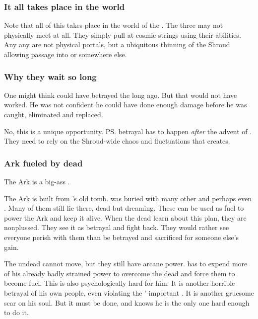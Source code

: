 \subsubsection{It all takes place in the \matrix{} world}
Note that all of this takes place in the world of the \matrices. 
The three may not physically meet at all. 
They simply pull at cosmic strings using their \vertex{} abilities. 
Any any  are not physical portals, but a ubiquitous thinning of the Shroud allowing passage into \Erebos{} or somewhere else. 





\subsubsection{Why they wait so long}
One might think \Azraid{} could have betrayed the \banes{} long ago. 
But that would not have worked. 
He was not confident he could have done enough damage before he was caught, eliminated and replaced. 

No, this is a unique opportunity. 
\ps{\Azraid} betrayal has to happen \emph{after} the advent of \Lithrim. 
They need to rely on the Shroud-wide chaos and fluctuations that \Lithrim{} creates.





\subsubsection{Ark fueled by dead \ophidians}
The Ark is a big-ass . 

The Ark is built from \Sethicus's old tomb. 
\Sethicus was buried with many other \ophidians and perhaps even \dragons.
Many of them still lie there, dead but dreaming. 
These can be used as fuel to power the Ark and keep it alive. 
When the dead learn about this plan, they are nonplussed. 
They see it as betrayal and fight back. 
They would rather see everyone perish with them than be betrayed and sacrificed for someone else's gain. 

The undead cannot move, but they still have arcane power. 
\Ishnaruchaefir has to expend more of his already badly strained power to overcome the dead and force them to become fuel. 
This is also psychologically hard for him: 
It is another horrible betrayal of his own people, even violating the \dragons' important . 
It is another gruesome scar on his soul. 
But it must be done, and \Ishnaruchaefir knows he is the only one hard enough to do it. 

